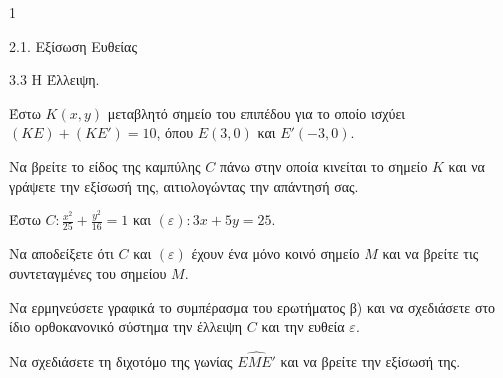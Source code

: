 \begin{ylh}{1}
    \item 2.1. Εξίσωση Ευθείας
    \item 3.3 Η Έλλειψη.
\end{ylh}
Έστω $K(x,y)$ μεταβλητό σημείο του επιπέδου για το οποίο ισχύει $(KE)+(KE')=10$, όπου $E(3,0)$ και $E'(-3,0)$.

\begin{alist}
\item Να βρείτε το είδος της καμπύλης $C$ πάνω στην οποία κινείται το σημείο $K$ και να γράψετε την εξίσωσή της, αιτιολογώντας την απάντησή σας. 
\end{alist}
Έστω $C: \frac{x^2}{25} + \frac{y^2}{16} = 1$ και $(\varepsilon): 3x+5y = 25$.

\begin{alist}
\item Να αποδείξετε ότι $C$ και $(\varepsilon)$ έχουν ένα μόνο κοινό σημείο $M$ και να βρείτε τις συντεταγμένες του σημείου $M$. 

\item Να ερμηνεύσετε γραφικά το συμπέρασμα του ερωτήματος β) και να σχεδιάσετε στο ίδιο ορθοκανονικό σύστημα την έλλειψη $C$ και την ευθεία $\varepsilon$. 

\item Να σχεδιάσετε τη διχοτόμο της γωνίας $\widehat{EME'}$ και να βρείτε την εξίσωσή της. 
\end{alist}